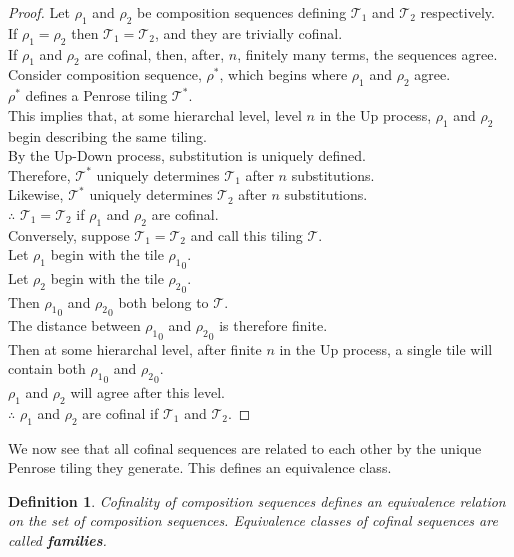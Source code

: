 \documentclass[
  oneside,
  11pt, a4paper,
  footinclude=true,
  headinclude=true,
  cleardoublepage=empty
]{scrbook}
\newtheorem{mydef}{Definition}
\begin{document}
\begin{proof}
Let $\rho_1$ and $\rho_2$ be composition sequences defining $\mathcal{T}_1$ and $\mathcal{T}_2$ respectively. \\[10pt]
If $\rho_1 = \rho_2$ then $\mathcal{T}_1 = \mathcal{T}_2$, and they are trivially cofinal.\\[10pt]
If $\rho_1$ and $\rho_2$ are cofinal, then, after, $n$, finitely many terms, the sequences agree.\\
Consider composition sequence, $\rho^*$, which begins where $\rho_1$ and $\rho_2$ agree.\\
$\rho^*$ defines a Penrose tiling  $\mathcal{T}^*$.\\
This implies that, at some hierarchal level, level $n$ in the Up process, $\rho_1$ and $\rho_2$ begin describing the same tiling.\\
By the Up-Down process, substitution is uniquely defined.\\
Therefore, $\mathcal{T}^*$ uniquely determines $\mathcal{T}_1$ after $n$ substitutions.\\
Likewise, $\mathcal{T}^*$ uniquely determines $\mathcal{T}_2$ after $n$ substitutions.\\
$\therefore$ $\mathcal{T}_1 = \mathcal{T}_2$ if  $\rho_1$ and $\rho_2$ are cofinal.\\[10pt]
Conversely, suppose $\mathcal{T}_1 = \mathcal{T}_2$ and call this tiling $\mathcal{T}$. \\
Let $\rho_1$ begin with the tile  ${\rho_1}_0$.\\
Let $\rho_2$ begin with the tile ${\rho_2}_0$.\\
Then ${\rho_1}_0$ and ${\rho_2}_0$ both belong to $\mathcal{T}$.\\
The distance between ${\rho_1}_0$ and ${\rho_2}_0$ is therefore finite.\\
Then at some hierarchal level, after finite $n$ in the Up process, a single tile will contain both ${\rho_1}_0$ and ${\rho_2}_0$.\\
$\rho_1$ and $\rho_2$ will agree after this level.\\
$\therefore$ $\rho_1$ and $\rho_2$ are cofinal if $\mathcal{T}_1$ and $\mathcal{T}_2$.
\end{proof}

We now see that all cofinal sequences are related to each other by the unique Penrose tiling they generate. This defines an equivalence class.

\begin{mydef}
Cofinality of composition sequences defines an equivalence relation on the set of composition sequences. Equivalence classes of cofinal sequences are called \textbf{families}.
\end{mydef}
\end{document}
